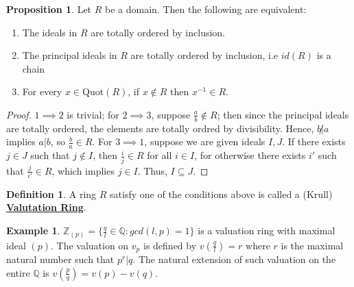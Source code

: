 \documentclass{article}
\theoremstyle{definition}
\theoremstyle{definition}
\theoremstyle{definition}
\newtheorem{proposition}{Proposition}[section]
\theoremstyle{definition}
\theoremstyle{definition}
\newtheorem{definition}{Definition}[section]
\theoremstyle{definition}
\theoremstyle{definition}
\newtheorem{example}{Example}[section]
\begin{document}
\begin{tcolorbox}[colback=blue!5!white,colframe=blue!30!white]
\begin{proposition}
    Let $R$ be a domain. Then the following are equivalent:
    \begin{enumerate}
        \item The ideals in $R$ are totally ordered by inclusion.
        \item The principal ideals in $R$ are totally ordered by inclusion, i.e $id(R)$ is a chain
        \item For every $x\in \textrm{Quot}(R)$, if $x\not \in R$ then $x^{-1}\in R$. 
    \end{enumerate}
\end{proposition}
\end{tcolorbox}
\begin{proof}
    $1\implies 2$ is trivial;  for $2 \implies 3$, suppose $\frac{a}{b}\not \in R$; then since the principal ideals are totally ordered, the elements are totally ordred by divisibility. Hence, $b\not | a$ implies $a|b$, so $\frac{b}{a}\in R$. For $3 \implies 1$, suppose we are given ideals $I,J$. If there exists $j\in J$ such that $j\not \in I$, then $\frac{i}{j}\in R$ for all $i\in I$, for otherwise there exists $i'$ such that $\frac{j}{i'}\in R$, which implies $j\in I$. Thus, $I\subseteq J$. 
\end{proof}

\begin{tcolorbox}[colback=purple!5!white,colframe=purple!75!black]
\begin{definition}
A ring $R$ satisfy one of the conditions above is called a (Krull) \underline{\textbf{Valutation Ring}}.
\end{definition}
\end{tcolorbox}


\begin{tcolorbox}[colback=yellow!5!white,colframe=yellow!30!white]
\begin{example}
$\mathbb{Z}_{(p)}=\{ \frac{q}{l}\in \mathbb{Q}: gcd(l,p)=1 \}$ is a valuation ring with maximal ideal $(p)$. The valuation on $v_p$ is defined by $v(\frac{q}{l})=r$ where $r$ is the maximal natural number such that $p^r|q$. The natural extension of such valuation on the entire $\mathbb{Q}$ is $v(\frac{p}{q})=v(p)-v(q)$. 
\end{example}
\end{tcolorbox}
\end{document}
